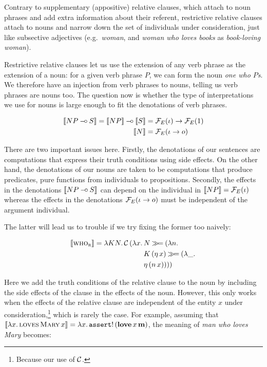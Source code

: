 Contrary to supplementary (appositive) relative clauses, which attach to
noun phrases and add extra information about their referent, restrictive
relative clauses attach to nouns and narrow down the set of individuals
under consideration, just like subsective adjectives (e.g.\ \emph{woman},
and \emph{woman who loves books} as \emph{book-loving woman}).

Restrictive relative clauses let us use the extension of any verb phrase as
the extension of a noun: for a given verb phrase $P$, we can form the noun
\emph{one who $P$s}. We therefore have an injection from verb phrases to
nouns, telling us verb phrases are nouns too. The question now is whether
the type of interpretations we use for nouns is large enough to fit the
denotations of verb phrases.

\begin{align*}
  \llbracket NP \mathbin{{-}\mkern-3.5mu{\circ}} S \rrbracket = \llbracket NP \rrbracket \mathbin{{-}\mkern-3.5mu{\circ}} \llbracket S \rrbracket &= \mathcal{F}_E(\iota) \to \mathcal{F}_E(1) \\
  \llbracket N \rrbracket &= \mathcal{F}_E(\iota \to o)
\end{align*}

There are two important issues here. Firstly, the denotations of our
sentences are computations that express their truth conditions using side
effects. On the other hand, the denotations of our nouns are taken to be
computations that produce predicates, pure functions from individuals to
propositions. Secondly, the effects in the denotations $\llbracket NP \mathbin{{-}\mkern-3.5mu{\circ}} S \rrbracket$
can depend on the individual in $\llbracket NP \rrbracket = \mathcal{F}_E(\iota)$ whereas the
effects in the denotations $\mathcal{F}_E(\iota \to o)$ must be independent of the
argument individual.

The latter will lead us to trouble if we try fixing the former too naively:

\begin{align*}
  \llbracket \textsc{who}_{\textsc{r}} \rrbracket = \lambda K N.\, \mathcal{C}\,(\lambda x.\, 
    &N \mathbin{\gg\!=} (\lambda n.\,  \\
    &K\,(\eta\,x) \mathbin{\gg\!=} (\lambda \_.\,  \\
    &\eta\,(n\,x))))
\end{align*}

Here we add the truth conditions of the relative clause to the noun by
including the side effects of the clause in the effects of the
noun. However, this only works when the effects of the relative clause are
independent of the entity $x$ under consideration,\footnote{Because our use
  of $\mathcal{C}$.} which is rarely the case. For example, assuming that
$\llbracket \lambda x.\, \textsc{loves}\,\textsc{Mary}\,x \rrbracket =
\lambda x.\, \mathtt{assert}!\,(\textbf{love}\,x\,\textbf{m})$, the meaning of
\emph{man who loves Mary} becomes:

